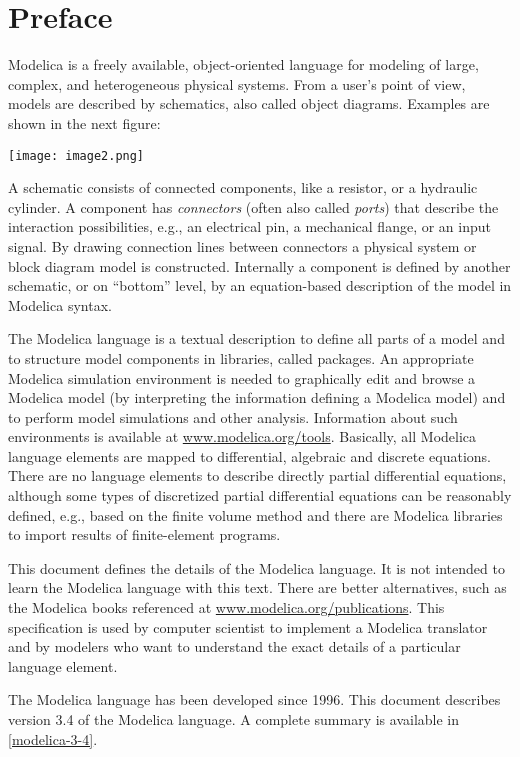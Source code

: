 \chapter*{Preface}
Modelica is a freely available, object-oriented language for modeling of
large, complex, and heterogeneous physical systems. From a user's point
of view, models are described by schematics, also called object
diagrams. Examples are shown in the next figure:

\texttt{[image: image2.png]}

A schematic consists of connected components, like a resistor, or a
hydraulic cylinder. A component has \emph{connectors} (often also called
\emph{ports}) that describe the interaction possibilities, e.g., an
electrical pin, a mechanical flange, or an input signal. By drawing
connection lines between connectors a physical system or block diagram
model is constructed. Internally a component is defined by another
schematic, or on ``bottom'' level, by an equation-based description of
the model in Modelica syntax.

The Modelica language is a textual description to define all parts of a
model and to structure model components in libraries, called packages.
An appropriate Modelica simulation environment is needed to graphically
edit and browse a Modelica model (by interpreting the information
defining a Modelica model) and to perform model simulations and other
analysis. Information about such environments is available at
\href{http://www.modelica.org/tools}{www.modelica.org/tools}. Basically,
all Modelica language elements are mapped to differential, algebraic and
discrete equations. There are no language elements to describe directly
partial differential equations, although some types of discretized
partial differential equations can be reasonably defined, e.g., based on
the finite volume method and there are Modelica libraries to import
results of finite-element programs.

This document defines the details of the Modelica language. It is not
intended to learn the Modelica language with this text. There are better
alternatives, such as the Modelica books referenced at
\href{http://www.modelica.org/publications}{www.modelica.org/publications}.
This specification is used by computer scientist to implement a Modelica
translator and by modelers who want to understand the exact details of a
particular language element.

The Modelica language has been developed since 1996. This document
describes version 3.4 of the Modelica language. A complete summary is
available in \autoref{modelica-3-4}.
